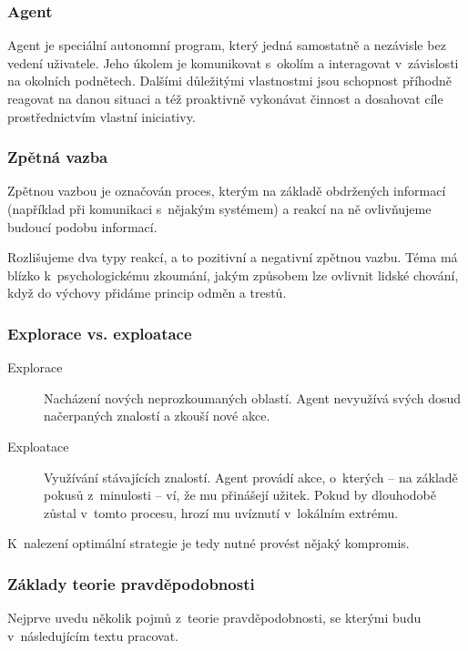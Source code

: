 \documentclass[thesis=M,czech]{FITthesis}[2014/05/07]
\begin{document}
\subsubsection{Agent}
\label{agent}
Agent je speciální autonomní program, který jedná samostatně a nezávisle bez vedení uživatele. Jeho úkolem je komunikovat s~okolím a interagovat v~závislosti na okolních podnětech. Dalšími důležitými vlastnostmi jsou schopnost příhodně reagovat na danou situaci a též proaktivně vykonávat činnost a dosahovat cíle prostřednictvím vlastní iniciativy.

\subsubsection{Zpětná vazba}
\label{feedback}
Zpětnou vazbou je označován proces, kterým na základě obdržených informací (například při komunikaci s~nějakým systémem) a reakcí na ně ovlivňujeme budoucí podobu informací.

Rozlišujeme dva typy reakcí, a to pozitivní a negativní zpětnou vazbu. Téma má blízko k~psychologickému zkoumání, jakým způsobem lze ovlivnit lidské chování, když do výchovy přidáme princip odměn a trestů.

\subsubsection{Explorace vs. exploatace}
\label{sub:explo}

\begin{description}
  \item[Explorace] Nacházení nových neprozkoumaných oblastí. Agent nevyužívá svých dosud načerpaných znalostí a zkouší nové akce. 
  \item[Exploatace] Využívání stávajících znalostí. Agent provádí akce, o~kterých – na základě pokusů z~minulosti – ví, že mu přinášejí užitek. Pokud by dlouhodobě zůstal v~tomto procesu, hrozí mu uvíznutí v~lokálním extrému.
\end{description}	

K~nalezení optimální strategie je tedy nutné provést nějaký kompromis.

\subsubsection{Základy teorie pravděpodobnosti}

Nejprve uvedu několik pojmů z~teorie pravděpodobnosti, se kterými budu v~následujícím textu pracovat.
\end{document}
